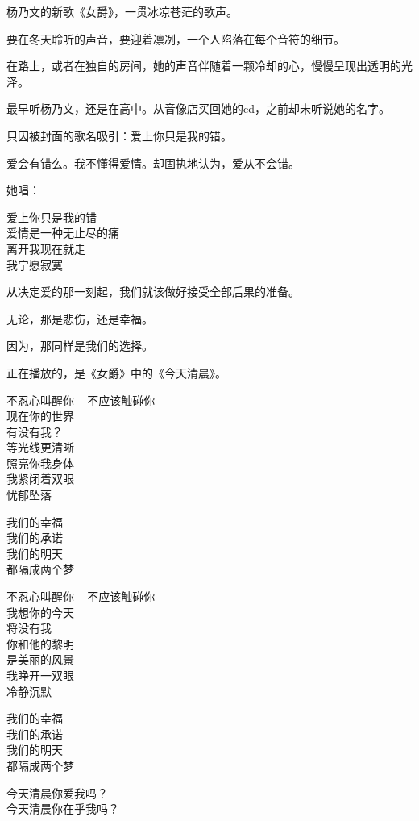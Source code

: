 \documentclass[12pt,a4paper]{article}
\begin{document}
		杨乃文的新歌《女爵》，一贯冰凉苍茫的歌声。\par
		要在冬天聆听的声音，要迎着凛冽，一个人陷落在每个音符的细节。\par
		在路上，或者在独自的房间，她的声音伴随着一颗冷却的心，慢慢呈现出透明的光泽。

		最早听杨乃文，还是在高中。从音像店买回她的cd，之前却未听说她的名字。\par
		只因被封面的歌名吸引：爱上你只是我的错。\par
		爱会有错么。我不懂得爱情。却固执地认为，爱从不会错。

		她唱：

		\longpoem{}{}{}
		爱上你只是我的错 \\
		爱情是一种无止尽的痛 \\
		离开我现在就走 \\
		我宁愿寂寞
		\endlongpoem

		从决定爱的那一刻起，我们就该做好接受全部后果的准备。\par
		无论，那是悲伤，还是幸福。\par
		因为，那同样是我们的选择。

		正在播放的，是《女爵》中的《今天清晨》。

		\longpoem{}{}{}
		不忍心叫醒你 ~ 不应该触碰你 \\
		现在你的世界 \\
		有没有我？\\
		等光线更清晰 \\
		照亮你我身体 \\
		我紧闭着双眼 \\
		忧郁坠落

		我们的幸福 \\
		我们的承诺 \\
		我们的明天 \\
		都隔成两个梦

		不忍心叫醒你 ~ 不应该触碰你 \\
		我想你的今天 \\
		将没有我 \\
		你和他的黎明 \\
		是美丽的风景 \\
		我睁开一双眼 \\
		冷静沉默

		我们的幸福 \\
		我们的承诺 \\
		我们的明天 \\
		都隔成两个梦

		今天清晨你爱我吗？\\
		今天清晨你在乎我吗？
		\endlongpoem
\end{document}
